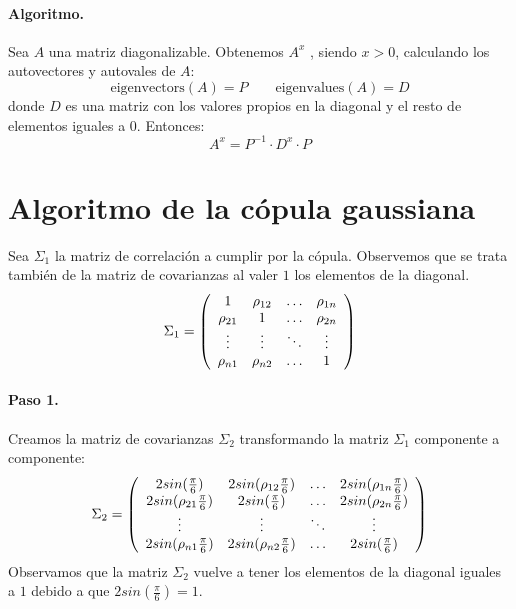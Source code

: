 \paragraph{Algoritmo.}
Sea $A$ una matriz diagonalizable. Obtenemos $A^x$ , siendo $x > 0$, calculando
los autovectores y autovales de $A$:
\begin{displaymath}
\textrm{eigenvectors}(A) = P \qquad \textrm{eigenvalues}(A) = D
\end{displaymath}
donde $D$ es una matriz con los valores propios en la diagonal y el resto de
elementos iguales a $0$. Entonces:
\begin{displaymath}
A^x = P^{-1} \cdot D^x \cdot P
\end{displaymath}


\section{Algoritmo de la c\'opula gaussiana}
\label{apendix:gaussiancopula}

 Sea $\Sigma_1$ la matriz de correlaci\'on a cumplir
por la c\'opula. Observemos que se trata tambi\'en de la matriz de covarianzas
al valer $1$ los elementos de la diagonal.
\begin{displaymath}
\Sigma_1 = \left( 
\begin{array}{cccc}
1          & \rho_{12} & \ldots & \rho_{1n} \cr
\rho_{21} & 1          & \ldots & \rho_{2n} \cr
\vdots    & \vdots    & \ddots & \vdots   \cr
\rho_{n1} & \rho_{n2} & \ldots & 1
\end{array}
\right)
\end{displaymath}

\paragraph{Paso 1.} Creamos la matriz de covarianzas $\Sigma_2$ transformando 
la matriz $\Sigma_1$ componente a componente:
\begin{displaymath}
\Sigma_2 = \left( 
\begin{array}{cccc}
2 sin(\frac{\pi}{6})           & 2 sin(\rho_{12} \frac{\pi}{6}) & \ldots & 2 sin(\rho_{1n} \frac{\pi}{6})\cr
2 sin(\rho_{21} \frac{\pi}{6}) & 2 sin(\frac{\pi}{6})           & \ldots & 2 sin(\rho_{2n} \frac{\pi}{6})\cr
\vdots                          & \vdots                          & \ddots  & \vdots   \cr
2 sin(\rho_{n1} \frac{\pi}{6}) & 2 sin(\rho_{n2} \frac{\pi}{6}) & \ldots & 2 sin(\frac{\pi}{6})
\end{array}
\right)
\end{displaymath}
Observamos que la matriz $\Sigma_2$ vuelve a tener los elementos de la
diagonal iguales a $1$ debido a que $2 sin(\frac{\pi}{6}) = 1$.

